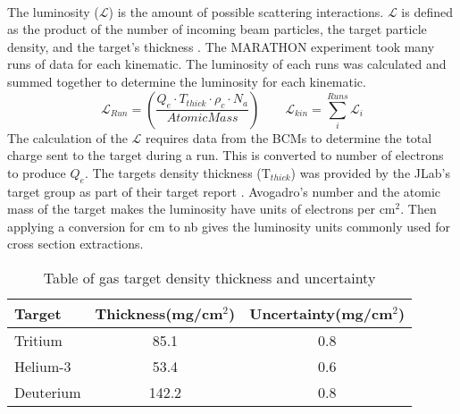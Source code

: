 \paragraph{} The luminosity ($\mathscr{L}$) is the amount of possible scattering interactions. $\mathscr{L}$ is defined as the product of the number of incoming beam particles, the target particle density, and the target's thickness \cite{PnN}. The MARATHON experiment took many runs of data for each kinematic. The luminosity of each runs was calculated and summed together to determine the luminosity for each kinematic. 
\begin{equation}
	\mathscr{L}_{Run} =  \left(\frac{Q_e \cdot T_{thick} \cdot \rho_c \cdot N_a}{AtomicMass} \right) \qquad
	\mathscr{L}_{kin} = \sum_i^{Runs} \mathscr{L}_{i}
\end{equation}
The calculation of the $\mathscr{L}$ requires data from the BCMs to determine the total charge sent to the target during a run. This is converted to number of electrons to produce $Q_e$. The targets density thickness (T$_{thick}$) was provided by the JLab's target group as part of their target report \cite{HATT_eng}. Avogadro's number and the atomic mass of the target makes the luminosity have units of electrons per cm$^2$. Then applying a conversion for cm to nb gives the luminosity units commonly used for cross section extractions.
\begin{table}[]
	\caption{Table of gas target density thickness and uncertainty \cite{HATT_eng}}
	\centering
	\begin{tabular}{lcc}
	Target &Thickness(mg/cm$^2$) & Uncertainty(mg/cm$^2$)   \\
	\hline
	Tritium & 85.1 & 0.8 \\
	Helium-3 & 53.4 & 0.6\\
	Deuterium & 142.2 & 0.8\\
	\hline
	\end{tabular}
\end{table}
